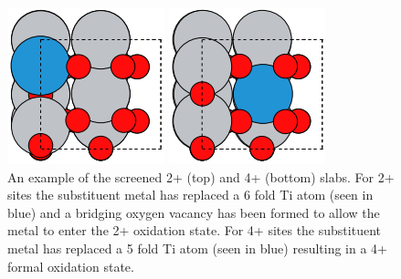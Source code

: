 \begin{figure}
    \centering
    \includegraphics[width=0.5\linewidth]{Images/ex_2+_slab.png}

    \centering
    \includegraphics[width=0.5\linewidth]{Images/ex_4+_slab.png}
    \caption{An example of the screened 2+ (top) and 4+ (bottom) slabs. For 2+ sites the substituent metal has replaced a 6 fold Ti atom (seen in blue) and a bridging oxygen vacancy has been formed to allow the metal to enter the 2+ oxidation state.  For 4+ sites the substituent metal has replaced a 5 fold Ti atom (seen in blue) resulting in a 4+ formal oxidation state.}%
    \label{fig:2ex_slab}
\end{figure}


